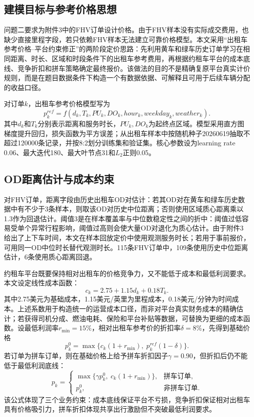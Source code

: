 \documentclass[UTF8,a4paper,12pt]{ctexart}
\begin{document}
\subsection{建模目标与参考价格思想}
问题二要求为附件3中的FHV订单设计价格。由于FHV样本没有实际成交费用，也缺少直接里程字段，若只依赖FHV样本无法建立可靠价格模型。本文采用“出租车参考价格--平台约束修正”的两阶段定价思路：先利用黄车和绿车历史订单学习在相同距离、时长、区域和时段条件下的出租车参考费用，再根据约租车平台的成本底线、竞争折扣和拼车策略确定最终报价。该做法的目的不是精确复原平台真实计价规则，而是在题目数据条件下构造一个有数据依据、可解释且可用于后续车辆分配的收益口径。

对订单$k$，出租车参考价格模型写为
\begin{equation}
    p_{k}^{ref}=f(d_k,T_k,PU_k,DO_k,hour_k,weekday_k,weather_k).
\end{equation}
其中$d_k$和$T_k$分别表示距离和服务时长，$PU_k,DO_k$为起终点区域。模型采用直方图梯度提升回归，损失函数为平方误差；从出租车样本中按随机种子20260619抽取不超过120000条记录，并按8:2划分训练集和验证集。核心参数设为learning rate 0.06、最大迭代180、最大叶节点31和$L_2$正则0.05。

\subsection{OD距离估计与成本约束}
对FHV订单，距离字段由历史出租车OD对估计：若其OD对在黄车和绿车历史数据中有不少于3条样本，则取该OD对历史中位距离；否则使用区域质心距离乘以1.3作为回退估计。阈值3是在样本覆盖率与中位数稳定性之间的折中：阈值过低容易受单个异常行程影响，阈值过高则会使大量OD对退化为质心估计。由于附件3给出了上下车时间，本文在样本回放定价中使用观测服务时长；若用于事前报价，可用同一OD中位时长替代观测时长。115条FHV订单中，109条使用历史中位距离估计，6条使用质心距离回退。

约租车平台既要保持相对出租车的价格竞争力，又不能低于成本和最低利润要求。本文设定线性成本函数：
\begin{equation}
    c_k=2.75+1.15d_k+0.18T_k.
\end{equation}
其中2.75美元为基础成本，1.15美元/英里为里程成本，0.18美元/分钟为时间成本。上述系数用于构造统一的运营成本口径，而非对平台真实财务成本的精确估计；若获得司机分成、燃油电耗、保险和平台补贴等数据，可替换为更细的成本函数。设最低利润率$r_{\min}=15\%$，相对出租车参考价的折扣率$\delta=8\%$，先得到基础价格
\begin{equation}
    p^0_k=\max\{c_k(1+r_{\min}),\; p_{k}^{ref}(1-\delta)\}.
\end{equation}
若订单为拼车订单，则在基础价格上给予拼车折扣因子$\gamma=0.90$，但折扣后仍不能低于最低利润底线：
\begin{equation}
    p_k=\begin{cases}
    \max\{\gamma p^0_k,\;c_k(1+r_{\min})\}, & \text{拼车订单},\\
    p^0_k, & \text{非拼车订单}.
    \end{cases}
\end{equation}
该公式体现了三个业务约束：成本底线保证平台不亏损，竞争折扣保证相对出租车具有价格吸引力，拼车折扣体现共享出行激励但不突破最低利润要求。
\end{document}
